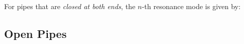 %
%    
%
%
%
%
For pipes that are \emph{closed at both ends}, the $n$-th resonance mode is
given by:
%  
%
%
%
\subsection{Open Pipes}

